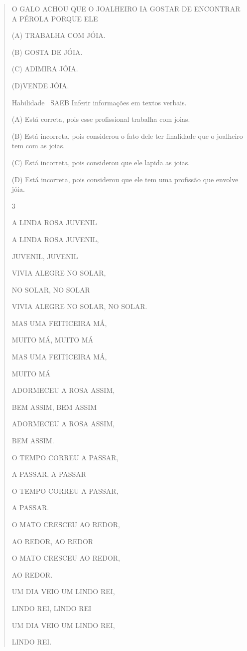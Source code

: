 {{{{\begin{verse}
{{\begin{escolha}
{{{{{O GALO ACHOU QUE O JOALHEIRO IA GOSTAR DE ENCONTRAR A PÉROLA PORQUE ELE

(A) TRABALHA COM JÓIA.

(B) GOSTA DE JÓIA.

(C) ADIMIRA JÓIA.

(D)VENDE JÓIA.

\protect\hypertarget{_Hlk129237824}{}{}Habilidade ~SAEB Inferir
informações em textos verbais.

\protect\hypertarget{_Hlk129241484}{}{}(A) Está correta, pois esse
profissional trabalha com joias.

(B) Está incorreta, pois considerou o fato dele ter finalidade que o
joalheiro tem com as joias.

(C) Está incorreta, pois considerou que ele lapida as joias.

(D) Está incorreta, pois considerou que ele tem uma profissão que
envolve jóia.

\num{3}

A LINDA ROSA JUVENIL

A LINDA ROSA JUVENIL,

JUVENIL, JUVENIL

VIVIA ALEGRE NO SOLAR,

NO SOLAR, NO SOLAR

VIVIA ALEGRE NO SOLAR, NO SOLAR.

MAS UMA FEITICEIRA MÁ,

MUITO MÁ, MUITO MÁ

MAS UMA FEITICEIRA MÁ,

MUITO MÁ

ADORMECEU A ROSA ASSIM,

BEM ASSIM, BEM ASSIM

ADORMECEU A ROSA ASSIM,

BEM ASSIM.

O TEMPO CORREU A PASSAR,

A PASSAR, A PASSAR

O TEMPO CORREU A PASSAR,

A PASSAR.

O MATO CRESCEU AO REDOR,

AO REDOR, AO REDOR

O MATO CRESCEU AO REDOR,

AO REDOR.

UM DIA VEIO UM LINDO REI,

LINDO REI, LINDO REI

UM DIA VEIO UM LINDO REI,

LINDO REI.

}}}}}
\end{escolha}}}
\end{verse}}}}}
